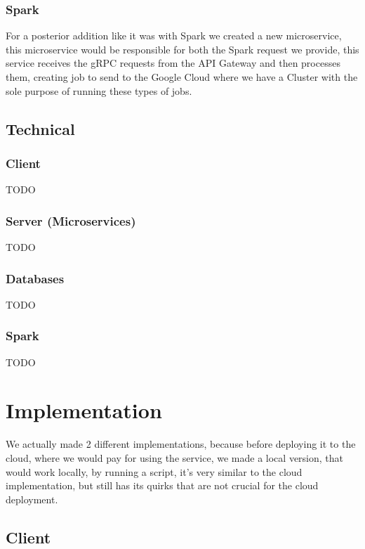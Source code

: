 \documentclass{article}
\newcommand*\fpar{\hspace{1ex}}
\begin{document}
    \subsubsection{Spark}
    \fpar For a posterior addition like it was with Spark we created a new microservice, this microservice would be responsible for both the Spark request we provide, this service receives the gRPC requests from the API Gateway and then processes them, creating job to send to the Google Cloud where we have a Cluster with the sole purpose of running these types of jobs.

  \subsection{Technical}
    \subsubsection{Client}
    \fpar TODO

    \subsubsection{Server (Microservices)}
    \fpar TODO

    \subsubsection{Databases}
    \fpar TODO

    \subsubsection{Spark}
    \fpar TODO

\section{Implementation}
\label{sec:implementation}
\fpar We actually made 2 different implementations, because before deploying it to the cloud, where we would pay for using the service, we made a local version, that would work locally, by running a script, it's very similar to the cloud implementation, but still has its quirks that are not crucial for the cloud deployment.

    \subsection{Client}
\end{document}
